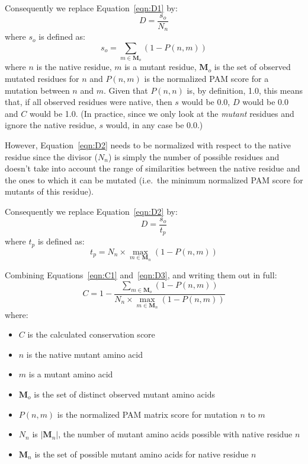 \documentclass[a4paper]{article}
\begin{document}
Consequently we replace Equation~\ref{eqn:D1} by:
\begin{equation}
  D = \frac{s_o}{N_n}
  \label{eqn:D2}
\end{equation}
where $s_o$ is defined as:
\begin{equation}
  s_o = \sum_{m \in \mathbf M_o} (1 - P(n,m))
\end{equation}
where $n$ is the native residue, $m$ is a mutant residue, $\mathbf M_o$ is
the set of observed mutated residues for $n$ and $P(n,m)$ is the
normalized PAM score for a mutation between $n$ and $m$. Given that
$P(n,n)$ is, by definition, 1.0, this means that, if all observed
residues were native, then $s$ would be 0.0, $D$ would be 0.0 and $C$
would be 1.0. (In practice, since we only look at the \emph{mutant}
residues and ignore the native residue, $s$ would, in any case be $0.0$.)

However, Equation~\ref{eqn:D2} needs to be normalized with respect to
the native residue since the divisor ($N_n$) is simply the number of
possible residues and doesn't take into account the range of
similarities between the native residue and the ones to which it can
be mutated (i.e.\ the minimum normalized PAM score for mutants of this
residue).

Consequently we replace Equation~\ref{eqn:D2} by:
\begin{equation}
  D = \frac{s_o}{t_p}
  \label{eqn:D3}
\end{equation}
where $t_p$ is defined as:
\begin{equation}
  t_p = N_n \times \max_{m \in \mathbf M_n} (1 - P(n,m))
\end{equation}

\noindent Combining Equations~\ref{eqn:C1} and~\ref{eqn:D3}, and writing
them out in full:
\begin{equation}
  C = 1 - \frac{\sum_{m \in \mathbf M_o} (1 - P(n,m))}{N_n \times \max_{m \in \mathbf M_n} (1 - P(n,m))}
\end{equation}
where:
\begin{itemize}
\item $C$ is the calculated conservation score
\item $n$ is the native mutant amino acid
\item $m$ is a mutant amino acid
\item $\mathbf M_o$ is the set of distinct observed mutant amino acids
\item $P(n,m)$ is the normalized PAM matrix score for mutation $n$ to $m$
\item $N_n$ is $|\mathbf M_n|$, the number of mutant amino acids possible with native residue $n$
\item $\mathbf M_n$ is the set of possible mutant amino acids for native residue $n$
\end{itemize}
\end{document}
